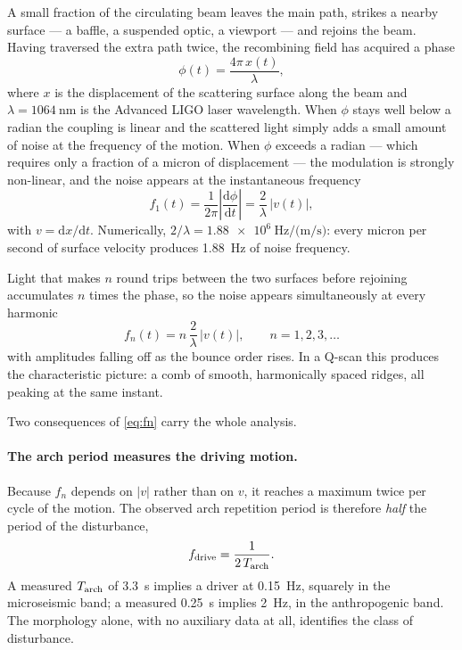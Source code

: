 A small fraction of the circulating beam leaves the main path, strikes a
nearby surface --- a baffle, a suspended optic, a viewport --- and rejoins the
beam. Having traversed the extra path twice, the recombining field has
acquired a phase
%
\begin{equation}
  \phi(t) = \frac{4\pi\,x(t)}{\lambda},
  \label{eq:phase}
\end{equation}
%
where $x$ is the displacement of the scattering surface along the beam and
$\lambda = \SI{1064}{\nano\metre}$ is the Advanced LIGO laser wavelength. When
$\phi$ stays well below a radian the coupling is linear and the scattered light
simply adds a small amount of noise at the frequency of the motion. When $\phi$
exceeds a radian --- which requires only a fraction of a micron of
displacement --- the modulation is strongly non-linear, and the noise appears
at the instantaneous frequency
%
\begin{equation}
  f_1(t) = \frac{1}{2\pi}\left|\frac{\mathrm{d}\phi}{\mathrm{d}t}\right|
         = \frac{2}{\lambda}\,|v(t)|,
  \label{eq:f1}
\end{equation}
%
with $v = \mathrm{d}x/\mathrm{d}t$. Numerically,
$2/\lambda = \SI{1.88e6}{\hertz\per(\metre\per\second)}$: every micron per
second of surface velocity produces \SI{1.88}{\hertz} of noise frequency.

Light that makes $n$ round trips between the two surfaces before rejoining
accumulates $n$ times the phase, so the noise appears simultaneously at every
harmonic
%
\begin{equation}
  f_n(t) = n\,\frac{2}{\lambda}\,|v(t)|, \qquad n = 1, 2, 3, \ldots
  \label{eq:fn}
\end{equation}
%
with amplitudes falling off as the bounce order rises. In a Q-scan this
produces the characteristic picture: a comb of smooth, harmonically spaced
ridges, all peaking at the same instant.

Two consequences of \cref{eq:fn} carry the whole analysis.

\paragraph{The arch period measures the driving motion.} Because $f_n$ depends
on $|v|$ rather than on $v$, it reaches a maximum twice per cycle of the
motion. The observed arch repetition period is therefore \emph{half} the
period of the disturbance,
%
\begin{equation}
  f_{\mathrm{drive}} = \frac{1}{2\,T_{\mathrm{arch}}}.
  \label{eq:fdrive}
\end{equation}
%
A measured $T_{\mathrm{arch}}$ of \SI{3.3}{\second} implies a driver at
\SI{0.15}{\hertz}, squarely in the microseismic band; a measured
\SI{0.25}{\second} implies \SI{2}{\hertz}, in the anthropogenic band. The
morphology alone, with no auxiliary data at all, identifies the class of
disturbance.

